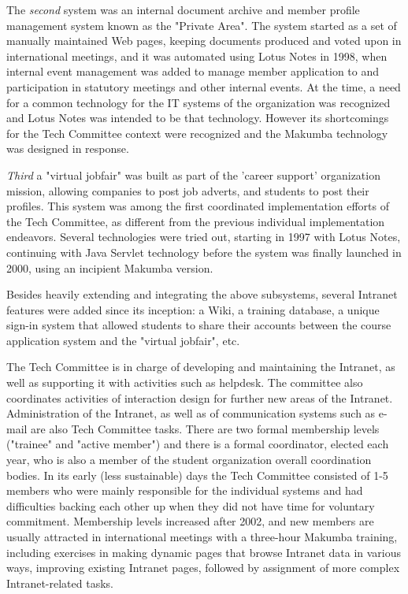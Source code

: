 \documentclass{acm_proc_article-sp}
\begin{document}
The {\it second} system was an internal document archive and member profile management system known as the "Private Area". The system started as a set of manually maintained Web pages, keeping documents produced and voted upon in international meetings, and it was automated using Lotus Notes in 1998, when internal event management was added to manage member application to and participation in statutory meetings and other internal events. At the time, a need for a common technology for the IT systems of the organization was recognized and Lotus Notes was intended to be that technology. However its shortcomings for the Tech Committee context were recognized and the Makumba technology was designed in response.

{\it Third} a "virtual jobfair" was built as part of the 'career support' organization mission,  allowing companies to post job adverts, and students to post their profiles. This system was among the first coordinated implementation efforts of the Tech Committee, as different from the previous individual implementation endeavors. Several technologies were tried out, starting in 1997 with Lotus Notes, continuing with Java Servlet technology before the system was finally launched in 2000, using an incipient Makumba version.

Besides heavily extending and integrating the above subsystems, several Intranet features were added since its inception: a Wiki, a training database, a unique sign-in system that allowed students to share their accounts between the course application system and the "virtual jobfair", etc.

The Tech Committee is in charge of developing and maintaining the Intranet, as well as supporting it with activities such as helpdesk. The committee also coordinates activities of interaction design for further new areas of the Intranet. Administration of the Intranet, as well as of communication systems such as e-mail are also Tech Committee tasks. There are two formal membership levels ("trainee" and "active member") and there is a formal coordinator, elected each year, who is also a member of the student organization overall coordination bodies. In its early (less sustainable) days the Tech Committee consisted of 1-5 members who were mainly responsible for the individual systems and had difficulties backing each other up when they did not have time for voluntary commitment. Membership levels increased after 2002, and new members are usually attracted in international meetings with a three-hour Makumba training, including exercises in making dynamic pages that browse Intranet data in various ways, improving existing Intranet pages, followed by assignment of more complex Intranet-related tasks.
\end{document}
